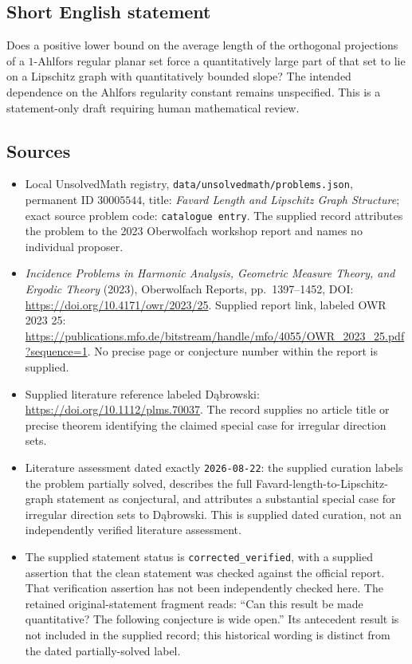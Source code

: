 \documentclass[11pt]{article}
\begin{document}
\subsection{Short English statement}
Does a positive lower bound on the average length of the orthogonal projections of a $1$-Ahlfors regular planar set force a quantitatively large part of that set to lie on a Lipschitz graph with quantitatively bounded slope? The intended dependence on the Ahlfors regularity constant remains unspecified. This is a statement-only draft requiring human mathematical review.
\subsection{Sources}
\begin{itemize}
\item Local UnsolvedMath registry, \texttt{data/unsolvedmath/problems.json}, permanent ID $30005544$, title: \emph{Favard Length and Lipschitz Graph Structure}; exact source problem code: \texttt{catalogue entry}. The supplied record attributes the problem to the 2023 Oberwolfach workshop report and names no individual proposer.
\item \emph{Incidence Problems in Harmonic Analysis, Geometric Measure Theory, and Ergodic Theory} (2023), Oberwolfach Reports, pp.~1397--1452, DOI: \url{https://doi.org/10.4171/owr/2023/25}. Supplied report link, labeled OWR 2023 25: \url{https://publications.mfo.de/bitstream/handle/mfo/4055/OWR_2023_25.pdf?sequence=1}. No precise page or conjecture number within the report is supplied.
\item Supplied literature reference labeled D\k{a}browski: \url{https://doi.org/10.1112/plms.70037}. The record supplies no article title or precise theorem identifying the claimed special case for irregular direction sets.
\item Literature assessment dated exactly \texttt{2026-08-22}: the supplied curation labels the problem partially solved, describes the full Favard-length-to-Lipschitz-graph statement as conjectural, and attributes a substantial special case for irregular direction sets to D\k{a}browski. This is supplied dated curation, not an independently verified literature assessment.
\item The supplied statement status is \texttt{corrected\_verified}, with a supplied assertion that the clean statement was checked against the official report. That verification assertion has not been independently checked here. The retained original-statement fragment reads: ``Can this result be made quantitative? The following conjecture is wide open.'' Its antecedent result is not included in the supplied record; this historical wording is distinct from the dated partially-solved label.
\end{itemize}
\end{document}
